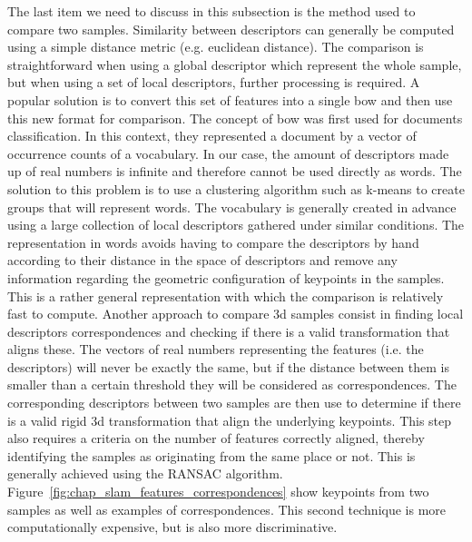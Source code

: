 The last item we need to discuss in this subsection is the method used to compare two samples. Similarity between descriptors can generally be computed using a simple distance metric (e.g. euclidean distance). The comparison is straightforward when using a global descriptor which represent the whole sample, but when using a set of local descriptors, further processing is required. A popular solution is to convert this set of features into a single \gls*{bow} and then use this new format for comparison. The concept of \gls*{bow} was first used for documents classification. In this context, they represented a document by a vector of occurrence counts of a vocabulary. In our case, the amount of descriptors made up of real numbers is infinite and therefore cannot be used directly as words. The solution to this problem is to use a clustering algorithm such as k-means to create groups that will represent words. The vocabulary is generally created in advance using a large collection of local descriptors gathered under similar conditions. The representation in words avoids having to compare the descriptors by hand according to their distance in the space of descriptors and remove any information regarding the geometric configuration of keypoints in the samples. This is a rather general representation with which the comparison is relatively fast to compute. Another approach to compare \gls*{3d} samples consist in finding local descriptors correspondences and checking if there is a valid transformation that aligns these. The vectors of real numbers representing the features (i.e. the descriptors) will never be exactly the same, but if the distance between them is smaller than a certain threshold they will be considered as correspondences. The corresponding descriptors between two samples are then use to determine if there is a valid rigid \gls*{3d} transformation that align the underlying keypoints. This step also requires a criteria on the number of features correctly aligned, thereby identifying the samples as originating from the same place or not. This is generally achieved using the RANSAC algorithm. Figure~\ref{fig:chap_slam_features_correspondences} show keypoints from two samples as well as examples of correspondences. This second technique is more computationally expensive, but is also more discriminative.

